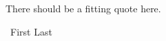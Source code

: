 \documentclass[\home/main.tex]{subfiles}
\begin{document}
\vspace*{0.2\paperheight}

\begin{center}
	\begin{minipage}{0.4\linewidth}
		\begin{flushleft}
			\huge\phdquotefont
			There should be a fitting quote here.
		\end{flushleft}
		\vspace{0.5cm}
		\begin{flushright}
			\Large\phdsansfont \textemdash\ First Last
		\end{flushright}
	\end{minipage}
\end{center}
\end{document}
